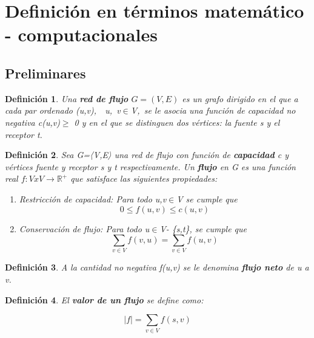 \documentclass[10pt]{article} %
\newtheorem{mydef}{Definici\'on}%
\begin{document}
	\section{Definici\'on en t\'erminos matem\'atico - computacionales}
	
	
	\subsection{Preliminares}
	
	\begin{mydef}
		Una \textbf{red de flujo} $G=(V,E)$ es un grafo dirigido en el que a cada par ordenado (u,v),  u, v$\in$V, se le asocia una función de capacidad no negativa c(u,v)$\geq$ 0 y en el que se distinguen dos vértices: la fuente s y el receptor t.
	\end{mydef}

	\begin{mydef}
		Sea G=〈V,E〉 una red de flujo con función de \textbf{capacidad} c y vértices fuente y receptor s y t respectivamente. Un \textbf{flujo} en G es una función real $f:V x V\rightarrow \mathbb{R}^+$ que satisface las siguientes propiedades:
		
		\begin{enumerate}
			\item Restricci\'on de capacidad: Para todo u,v$\in$V se cumple que
			\begin{equation}
				0 \leq f(u,v) \leq c(u,v)
			\end{equation}
		
			\item Conservaci\'on de flujo: Para todo u$\in$V- \{s,t\}, se cumple que
			\begin{equation}
				\sum_{v \in V} f(v,u) = \sum_{v \in V} f(u,v)
			\end{equation}
			
		\end{enumerate}
		
	\end{mydef}

	\begin{mydef}
		A la cantidad  no negativa f(u,v) se le denomina \textbf{flujo neto} de u a v.
	\end{mydef}

	\begin{mydef}
		El \textbf{valor de un flujo} se define como:
		
		\begin{equation}
			|f|=\sum_{v \in V} f(s,v)
		\end{equation}
	\end{mydef}
\end{document}
